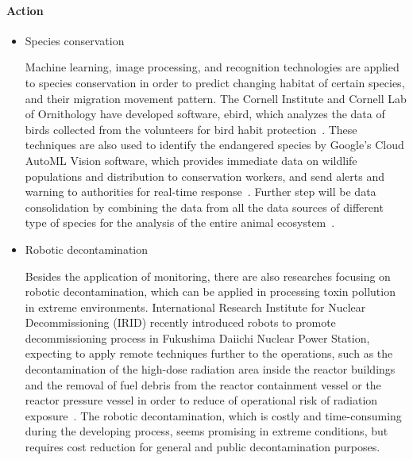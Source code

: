 \documentclass[letterpaper, twocolumn, 10pt, conference]{IEEEtran}
\begin{document}
\paragraph{Action}

\begin{itemize}

\item Species conservation

Machine learning, image processing, and recognition technologies are applied to species conservation in order to predict changing habitat of certain species, and their migration movement pattern. The Cornell Institute and Cornell Lab of Ornithology have developed software, ebird, which analyzes the data of birds collected from the volunteers for bird habit protection~\cite{AIsave-2018}.
These techniques are also used to identify the endangered species by Google's Cloud AutoML Vision software, which provides immediate data on wildlife populations and distribution to conservation workers, and send alerts and warning to authorities for real-time response~\cite{facialgoogle-2018}.
Further step will be data consolidation by combining the data from all the data sources of different type of species for the analysis of the entire animal ecosystem~\cite{bigprotect-2018}.

\item Robotic decontamination

Besides the application of monitoring, there are also researches focusing on robotic decontamination, which can be applied in processing toxin pollution in extreme environments. International Research Institute for Nuclear Decommissioning (IRID) recently introduced robots to promote decommissioning process in Fukushima Daiichi Nuclear Power Station, expecting to apply remote techniques further to the operations, such as the decontamination of the high-dose radiation area inside the reactor buildings and the removal of fuel debris from the reactor containment vessel or the reactor pressure vessel in order to reduce of operational risk of radiation exposure~\cite{application-robot}. The robotic decontamination, which is costly and time-consuming during the developing process, seems promising in extreme conditions, but requires cost reduction for general and public decontamination purposes.

\end{itemize}

\end{document}
